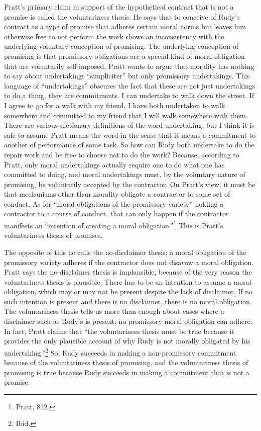 Pratt's primary claim in support of the hypothetical contract that is
not a promise is called the voluntariness thesis. He says that to
conceive of Rudy's contract as a type of promise that adheres certain
moral norms but leaves him otherwise free to not perform the work shows
an inconsistency with the underlying voluntary conception of promising.
The underlying conception of promising is that promissory obligations
are a special kind of moral obligation that are voluntarily
self-imposed. Pratt wants to argue that morality has nothing to say
about undertakings ``simpliciter'' but only promissory undertakings.
This language of ``undertakings'' obscures the fact that these are not
just undertakings to do a thing, they are commitments. I can undertake
to walk down the street. If I agree to go for a walk with my friend, I
have both undertaken to walk somewhere and committed to my friend that I
will walk somewhere with them. There are various dictionary definitions
of the word undertaking, but I think it is safe to assume Pratt means
the word in the sense that it means a commitment to another of
performance of some task. So how can Rudy both undertake to do the
repair work and be free to choose not to do the work? Because, according
to Pratt, only moral undertakings actually require one to do what one
has committed to doing, and moral undertakings must, by the voluntary
nature of promising, be voluntarily accepted by the contractor. On
Pratt's view, it must be that mechanisms other than morality obligate a
contractor to some set of conduct. As for ``moral obligations of the
promissory variety'' holding a contractor to a course of conduct, that
can only happen if the contractor manifests an ``intention of creating a
moral obligation.''\footnote{Pratt, 812.} This is Pratt's voluntariness
thesis of promises.

The opposite of this he calls the no-disclaimer thesis; a moral
obligation of the promissory variety adheres if the contractor does not
disavow a moral obligation. Pratt says the no-disclaimer thesis is
implausible, because of the very reason the voluntariness thesis is
plausible. There has to be an intention to assume a moral obligation,
which may or may not be present despite the lack of disclaimer. If no
such intention is present and there is no disclaimer, there is no moral
obligation. The voluntariness thesis tells us more than enough about
cases where a disclaimer such as Rudy's is present; no promissory moral
obligation can adhere. In fact, Pratt claims that ``the voluntariness
thesis must be true because it provides the only plausible account of
why Rudy is not morally obligated by his undertaking.''\footnote{Ibid.}
So, Rudy succeeds in making a non-promissory commitment because of the
voluntariness thesis of promising, and the voluntariness thesis of
promising is true because Rudy succeeds in making a commitment that is
not a promise.

